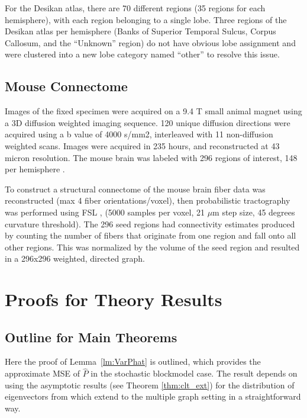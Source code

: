 \documentclass[journal,twoside,web]{ieeecolor}
\begin{document}
For the Desikan atlas, there are 70 different regions (35 regions for each hemisphere), with each region belonging to a single lobe. 
Three regions of the Desikan atlas per hemisphere (Banks of Superior Temporal Sulcus, Corpus Callosum, and the ``Unknown'' region) 
do not have obvious lobe assignment and were clustered into a new lobe category named ``other'' to resolve this issue.


\subsection{Mouse Connectome}
\label{section:data_mouse}

Images of the fixed specimen were acquired on a 9.4 T small animal magnet using a 3D diffusion weighted imaging sequence. 
120 unique diffusion directions were acquired using a b value of 4000 s/mm2, interleaved with 11 non-diffusion weighted scans. Images were acquired in 235 hours, and reconstructed at 43 micron resolution. The mouse brain was labeled with 296 regions of interest, 148 per hemisphere . 

To construct a structural connectome of the mouse brain fiber data was reconstructed (max 4 fiber orientations/voxel), then probabilistic tractography was performed using FSL ,
(5000 samples per voxel, 21 $\mu$m step size, 45 degrees curvature threshold). The 296 seed regions had connectivity estimates produced by counting the number of fibers that originate from one region and fall onto all other regions. This was normalized by the volume of the seed region and resulted in a 296x296 weighted, directed graph.




\section{Proofs for Theory Results}
\subsection{Outline for Main Theorems}
\label{section:outline_proof}
Here the proof of Lemma~\ref{lm:VarPhat} is outlined, which provides the approximate MSE of $\hat{P}$ in the stochastic blockmodel case.
The result depends on using the asymptotic results (see Theorem \ref{thm:clt_ext}) for the distribution of eigenvectors from  which extend to the multiple graph setting in a straightforward way.
\end{document}
